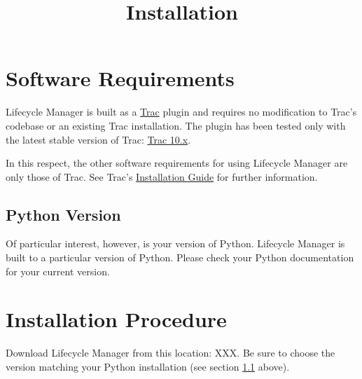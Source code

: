 \documentclass{article}
\title{Installation}
\begin{document}
\maketitle

\tableofcontents



\section{Software Requirements}

Lifecycle Manager is built as a \href{http://trac.edgewall.org/}{Trac} plugin
and requires no modification to Trac's codebase or an existing Trac installation.
The plugin has been tested only with the latest stable version of Trac: 
\href{http://trac.edgewall.org/wiki/TracDownload}{Trac 10.x}.

In this respect, the other software requirements for using Lifecycle Manager are
only those of Trac. See Trac's
\href{http://trac.edgewall.org/wiki/TracInstall}{Installation Guide} for further
information.

\subsection{Python Version}
\label{sec:python-version}

Of particular interest, however, is your version of Python. Lifecycle Manager is
built to a particular version of Python. Please check your Python documentation
for your current version.


\section{Installation Procedure}

Download Lifecycle Manager from this location: XXX. Be sure to choose the
version matching your Python installation (see section \ref{sec:python-version} above).
\end{document}
